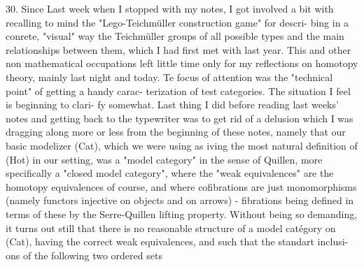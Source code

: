 30. Since Last week when I stopped with my notes, I got involved a bit
with recalling to mind the "Lego-Teichmüller construction game" for descri-%
bing in a conrete, "visual" way the Teichmüller groups of all possible
types and the main relationships between them, which I had first met with
last year. This and other non mathematical occupations left little time
only for my reflections on homotopy theory,  mainly last night and today.
Te focus of attention was the "technical point" of getting a handy carac-%
terization of test categories. The situation I feel is beginning to clari-%
fy somewhat. Last thing I did\hand{,} before reading last weeks' notes and getting
back to the typewriter\hand{,} was to get rid of a delusion which I was dragging
along more or less from the beginning of these notes, namely that our
basic modelizer (Cat), which we were using  as iving the most
natural definition of (Hot) in our setting, was a "model category" in the
sense of Quillen, more specifically a "closed model category", where
the "weak equivalences" are the homotopy equivalences of course, and where
cofibrations are just monomorphisms (namely functors injective on objects
and on arrows) - fibrations being defined in terms of these by the
\margin{$|$} Serre-Quillen lifting property. Without being so demanding, it turns out
still that there is no reasonable structure of a model catégory on (Cat),
having the correct weak equivalences, and such that the standart  inclusi-%
ons of the following two ordered sets
